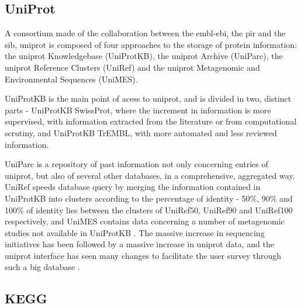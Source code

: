 \documentclass[
  oneside,
  11pt, a4paper,
  footinclude=true,
  headinclude=true,
  cleardoublepage=empty
]{scrbook}
\begin{document}
    \subsection{UniProt}
    
    A consortium made of the collaboration between the \gls{embl-ebi}, the \gls{pir} and the \gls{sib}, \gls{uniprot} is composed of four approaches to the storage of protein information: the \gls{uniprot} Knowledgebase (UniProtKB), the \gls{uniprot} Archive (UniParc), the \gls{uniprot} Reference Clusters (UniRef) and the \gls{uniprot} Metagenomic and Environmental Sequences (UniMES). 
    
    UniProtKB is the main point of acess to \gls{uniprot}, and is divided in two, distinct parts - UniProtKB SwissProt, where the increment in information is more supervised, with information extracted from the literature or from computational scrutiny, and UniProtKB TrEMBL, with more automated and less reviewed information. 
    
    UniParc is a repository of past information not only concerning entries of \gls{uniprot}, but also of several other databases, in a comprehensive, aggregated way. UniRef speeds database query by merging the information contained in UniProtKB into clusters according to the percentage of identity - 50\%, 90\% and 100\% of identity lies between the clusters of UniRef50, UniRef90 and UniRef100 respectively, and UniMES contains data concerning a number of metagenomic studies not available in UniProtKB \citep{UniProt2010, Bateman2015}. The massive increase in sequencing initiatives has been followed by a massive increase in \gls{uniprot} data, and the \gls{uniprot} interface has seen many changes to facilitate the user survey through such a big database \citep{Bateman2015}.
    
    \subsection{KEGG}
    
\end{document}
